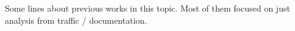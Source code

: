 Some lines about previous works in this topic. Most of them focused on just analysis from traffic / documentation. 